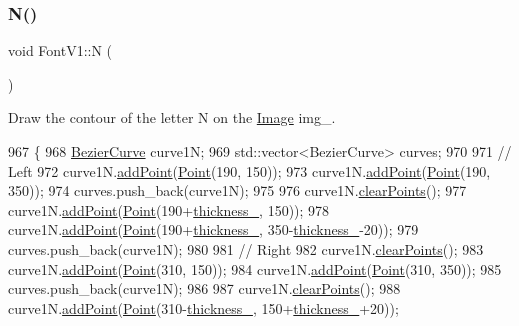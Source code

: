 \subsubsection{\texorpdfstring{N()}{N()}}
{\footnotesize\ttfamily void Font\+V1\+::N (\begin{DoxyParamCaption}{ }\end{DoxyParamCaption})}



Draw the contour of the letter N on the \mbox{\hyperlink{class_image}{Image}} img\+\_\+. 


\begin{DoxyCode}
967               \{
968     \mbox{\hyperlink{class_bezier_curve}{BezierCurve}} curve1N;
969     std::vector<BezierCurve> curves;
970 
971     \textcolor{comment}{// Left}
972     curve1N.\mbox{\hyperlink{class_bezier_curve_a38d16c18b36ae45619b05e26e226cf34}{addPoint}}(\mbox{\hyperlink{class_point}{Point}}(190, 150));
973     curve1N.\mbox{\hyperlink{class_bezier_curve_a38d16c18b36ae45619b05e26e226cf34}{addPoint}}(\mbox{\hyperlink{class_point}{Point}}(190, 350));
974     curves.push\_back(curve1N);
975 
976     curve1N.\mbox{\hyperlink{class_bezier_curve_a0ba8ce66d5af5971ae6a1b506029728e}{clearPoints}}();
977     curve1N.\mbox{\hyperlink{class_bezier_curve_a38d16c18b36ae45619b05e26e226cf34}{addPoint}}(\mbox{\hyperlink{class_point}{Point}}(190+\mbox{\hyperlink{class_font_v1_aed8040e76be9a52833627b92f0fb4e5f}{thickness\_}}, 150));
978     curve1N.\mbox{\hyperlink{class_bezier_curve_a38d16c18b36ae45619b05e26e226cf34}{addPoint}}(\mbox{\hyperlink{class_point}{Point}}(190+\mbox{\hyperlink{class_font_v1_aed8040e76be9a52833627b92f0fb4e5f}{thickness\_}}, 350-\mbox{\hyperlink{class_font_v1_aed8040e76be9a52833627b92f0fb4e5f}{thickness\_}}-20));
979     curves.push\_back(curve1N);
980 
981     \textcolor{comment}{// Right}
982     curve1N.\mbox{\hyperlink{class_bezier_curve_a0ba8ce66d5af5971ae6a1b506029728e}{clearPoints}}();
983     curve1N.\mbox{\hyperlink{class_bezier_curve_a38d16c18b36ae45619b05e26e226cf34}{addPoint}}(\mbox{\hyperlink{class_point}{Point}}(310, 150));
984     curve1N.\mbox{\hyperlink{class_bezier_curve_a38d16c18b36ae45619b05e26e226cf34}{addPoint}}(\mbox{\hyperlink{class_point}{Point}}(310, 350));
985     curves.push\_back(curve1N);
986 
987     curve1N.\mbox{\hyperlink{class_bezier_curve_a0ba8ce66d5af5971ae6a1b506029728e}{clearPoints}}();
988     curve1N.\mbox{\hyperlink{class_bezier_curve_a38d16c18b36ae45619b05e26e226cf34}{addPoint}}(\mbox{\hyperlink{class_point}{Point}}(310-\mbox{\hyperlink{class_font_v1_aed8040e76be9a52833627b92f0fb4e5f}{thickness\_}}, 150+\mbox{\hyperlink{class_font_v1_aed8040e76be9a52833627b92f0fb4e5f}{thickness\_}}+20));

\end{DoxyCode}
